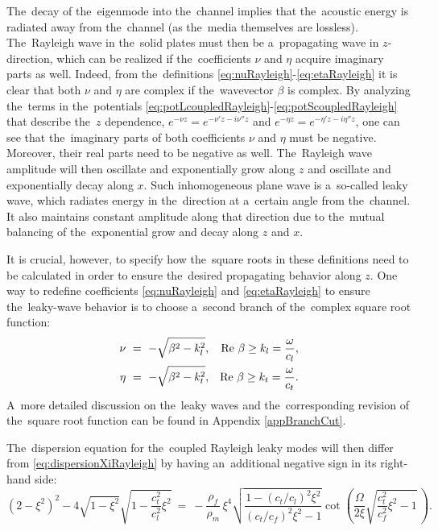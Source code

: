 The~decay of the~eigenmode into the~channel implies that the~acoustic energy is radiated away from the~channel (as the~media themselves are lossless).
The~Rayleigh wave in the~solid plates must then be a~propagating wave in $z$-direction, which can be realized if the~coefficients $\nu$ and $\eta$ acquire imaginary parts as well.
Indeed, from the~definitions \cref{eq:nuRayleigh}-\cref{eq:etaRayleigh} it is clear that both $\nu$ and $\eta$ are complex if the~wavevector $\beta$ is complex.
By analyzing the~terms in the~potentials \cref{eq:potLcoupledRayleigh}-\cref{eq:potScoupledRayleigh} that describe the~$z$ dependence, $e^{-\nu z}=e^{-\nu'z-i\nu''z}$ and $e^{-\eta z}=e^{-\eta'z-i\eta''z}$, one can see that the~imaginary parts of both coefficients $\nu$ and $\eta$ must be negative.
Moreover, their real parts need to be negative as well.
The~Rayleigh wave amplitude will then oscillate and exponentially grow along $z$ and oscillate and exponentially decay along $x$.
Such inhomogeneous plane wave is a~so-called leaky wave, which radiates energy in the~direction at a~certain angle from the~channel.
It also maintains constant amplitude along that direction due to the~mutual balancing of the~exponential grow and decay along $z$ and $x$.

It is crucial, however, to specify how the~square roots in these definitions need to be calculated in order to ensure the~desired propagating behavior along $z$.
One way to redefine coefficients \cref{eq:nuRayleigh} and \cref{eq:etaRayleigh} to ensure the~leaky-wave behavior is to choose a~second branch of the~complex square root function:
\begin{align}
\nu~&=~-\sqrt{\beta^2-k_l^2}, &\textrm{Re }\beta \ge k_l=\frac{\omega}{c_l}, \label{eq:numinusRayleigh}\\
\eta~&=~-\sqrt{\beta^2-k_t^2}, &\textrm{Re }\beta \ge k_t=\frac{\omega}{c_t}. \label{eq:etaminusRayleigh}
\end{align}
A~more detailed discussion on the~leaky waves and the~corresponding revision of the~square root function can be found in Appendix \ref{appBranchCut}.

The~dispersion equation for the~coupled Rayleigh leaky modes will then differ from \cref{eq:dispersionXiRayleigh} by having an~additional negative sign in its right-hand side:
\begin{equation}
\label{eq:dispersionXiLeakyRayleigh}
\left(2-\xi^2\right)^2-4\sqrt{1-\xi^2}\sqrt{1-\frac{c_t^2}{c_l^2}\xi^2}
~=~-\frac{\rho_f}{\rho_m}\,\xi^4 \sqrt{\frac{1-\left(c_t/c_l\right)^2\xi^2}{\left(c_t/c_f\right)^2\xi^2-1}}\cot\!\left(\frac{\Omega}{2\xi}\sqrt{\frac{c_t^2}{c_f^2} \xi^2-1}\,\right).
\end{equation}


